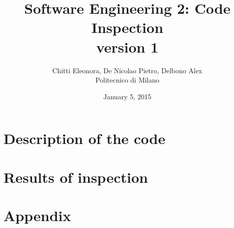 \documentclass[12pt, a4paper]{report}
\begin{document}
\title{Software Engineering 2: Code Inspection \\ version 1}
\author{Chitti Eleonora, De Nicolao Pietro, Delbono Alex\\
Politecnico di Milano}
\date{January 5, 2015}
\maketitle
\tableofcontents

\chapter{Description of the code}



\chapter{Results of inspection}



\appendix
\chapter{Appendix}




\end{document}
